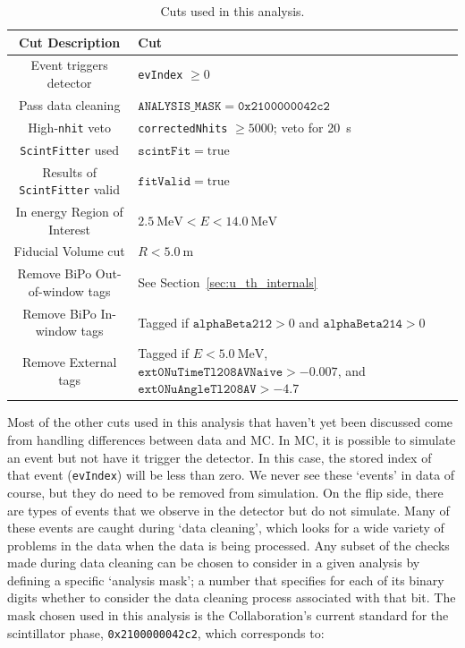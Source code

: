 \begin{table}
    \centering
    \begin{tabular}{c >{\centering\arraybackslash}m{7.5 cm}}
        \hline
        Cut Description                        & Cut                      \\ \hline \hline
        Event triggers detector                & \texttt{evIndex} $\ge 0$ \\
        Pass data cleaning                     & $\mathtt{ANALYSIS\_MASK} = \mathtt{0x2100000042c2}$ \\
        High-\texttt{nhit} veto                & \texttt{correctedNhits} $\ge 5000$; veto for \SI{20}{s} \\
        \texttt{ScintFitter} used              & $\mathtt{scintFit} = \mathrm{true}$ \\
        Results of \texttt{ScintFitter} valid  & $\mathtt{fitValid} = \mathrm{true}$ \\
        In energy Region of Interest           & $\SI{2.5}{\MeV} < E < \SI{14.0}{\MeV}$ \\
        Fiducial Volume cut                    & $R < \SI{5.0}{\metre}$ \\
        Remove BiPo Out-of-window tags         & See Section~\ref{sec:u_th_internals} \\
        Remove BiPo In-window tags             & Tagged if $\mathtt{alphaBeta212} > 0$ and $\mathtt{alphaBeta214} > 0$ \\
        Remove External tags                   & Tagged if $E < \SI{5.0}{\MeV}$, $\mathtt{ext0NuTimeTl208AVNaive} > -0.007$, and $\mathtt{ext0NuAngleTl208AV} > -4.7$ \\
        \hline
    \end{tabular}
    \caption{Cuts used in this analysis.}
    \label{tab:ev_selection}
\end{table}

Most of the other cuts used in this analysis that haven't yet been discussed come from handling differences between data and MC. In MC, it is possible to simulate an event but not have it trigger the detector. In this case, the stored index of that event (\texttt{evIndex}) will be less than zero. We never see these `events' in data of course, but they do need to be removed from simulation. On the flip side, there are types of events that we observe in the detector but do not simulate. Many of these events are caught during `data cleaning', which looks for a wide variety of problems in the data when the data is being processed. Any subset of the checks made during data cleaning can be chosen to consider in a given analysis by defining a specific `analysis mask'; a number that specifies for each of its binary digits whether to consider the data cleaning process associated with that bit. The mask chosen used in this analysis is the Collaboration's current standard for the scintillator phase, \texttt{0x2100000042c2}, which corresponds to:

